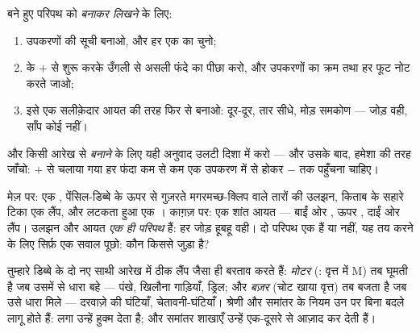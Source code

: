 \begin{method}[मेज़ से काग़ज़ तक, और वापस]\label{met:g6:circuits-and-safety:translate}
बने हुए परिपथ को \emph{बनाकर लिखने} के लिए:
\begin{enumerate}
  \item उपकरणों की सूची बनाओ, और हर एक का  चुनो;
  \item {} के $+$ से शुरू करके उँगली से असली फंदे का पीछा करो, और
        उपकरणों का क्रम तथा हर फूट नोट करते जाओ;
  \item इसे एक सलीक़ेदार आयत की तरह फिर से बनाओ:  दूर-दूर, तार
        सीधे, मोड़ समकोण --- जोड़ वही, साँप कोई नहीं।
\end{enumerate}
और किसी आरेख से \emph{बनाने} के लिए यही अनुवाद उलटी दिशा में करो ---
और उसके बाद, हमेशा की तरह जाँचो: $+$ से चलाया गया हर फंदा कम से कम
एक उपकरण में से होकर $-$ तक पहुँचना चाहिए।
\end{method}

\begin{example}[एक ही परिपथ, दो तसवीरें]\label{ex:g6:circuits-and-safety:portraits}
मेज़ पर: एक , पेंसिल-डिब्बे के ऊपर से गुज़रते मगरमच्छ-क्लिप वाले
तारों की उलझन, किताब के सहारे टिका एक लैंप, और लटकता हुआ एक ।
काग़ज़ पर: एक शांत आयत --- बाईं ओर , ऊपर , दाईं ओर लैंप।
उलझन और आयत \emph{एक ही परिपथ} हैं: हर जोड़ हूबहू वही। दो परिपथ एक हैं
या नहीं, यह तय करने के लिए सिर्फ़ एक सवाल पूछो: कौन किससे जुड़ा है?
\end{example}

\begin{example}[मोटर और बज़र भी खेल में]\label{ex:g6:circuits-and-safety:motor}
तुम्हारे डिब्बे के दो नए साथी आरेख में ठीक लैंप जैसा ही बरताव करते
हैं: \emph{मोटर} (: वृत्त में M) तब घूमती है जब उसमें
से धारा बहे --- पंखे, खिलौना गाड़ियाँ, ड्रिल; और
\emph{बज़र} (चोट खाया वृत्त) तब बजता है जब उसे धारा मिले
--- दरवाज़े की घंटियाँ, चेतावनी-घंटियाँ। श्रेणी और समांतर के नियम उन पर
बिना बदले लागू होते हैं:  लगा  उन्हें हुक्म देता है;
और समांतर शाखाएँ उन्हें एक-दूसरे से आज़ाद कर देती हैं।
\end{example}

